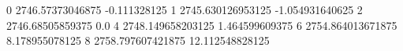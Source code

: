 0 2746.57373046875 -0.111328125
1 2745.630126953125 -1.054931640625
2 2746.68505859375 0.0
4 2748.149658203125 1.464599609375
6 2754.864013671875 8.178955078125
8 2758.797607421875 12.112548828125
